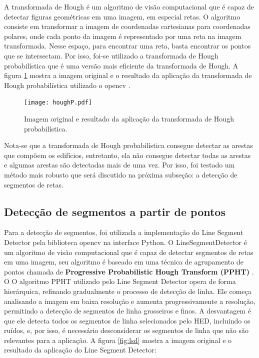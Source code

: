 \documentclass[12pt]{article}
\begin{document}
A transformada de Hough \cite{illingworth1988survey} é um algoritmo de visão computacional que é capaz de detectar figuras geométricas em uma imagem, em especial retas. O algoritmo consiste em transformar a imagem de coordenadas cartesianas para coordenadas polares, onde cada ponto da imagem é representado por uma reta na imagem transformada. Nesse espaço, para encontrar uma reta, basta encontrar os pontos que se intersectam. Por isso, foi-se utilizado a transformada de Hough probabilística \cite{matas2000robust} que é uma versão mais eficiente da transformada de Hough. A figura \ref{fig:hough} mostra a imagem original e o resultado da aplicação da transformada de Hough probabilística utilizado o opencv \cite{opencv_hough}.


\begin{figure}
\centering
\texttt{[image: houghP.pdf]}
\caption{Imagem original e resultado da aplicação da transformada de Hough probabilística.}
\label{fig:hough}
\end{figure}

Nota-se que a transformada de Hough probabilística consegue detectar as arestas que compõem os edifícios, entretanto, ela não consegue detectar todas as arestas e algumas arestas são detectadas mais de uma vez. Por isso, foi testado um método mais robusto que será discutido na próxima subseção: a detecção de segmentos de retas.

\subsection{Detecção de segmentos a partir de pontos}

Para a detecção de segmentos, foi utilizada a implementação do Line Segment Detector \cite{opencv_manual} pela biblioteca opencv \cite{opencv_library} na interface Python. O LineSegmentDetector é um algoritmo de visão computacional que é capaz de detectar segmentos de retas em uma imagem, seu algoritmo é baseado em uma técnica de agrupamento de pontos chamada de \textbf{Progressive Probabilistic Hough Transform (PPHT)} \cite{matas2000robust}. O O algoritmo PPHT utilizado pelo Line Segment Detector opera de forma hierárquica, refinando gradualmente o processo de detecção de linha. Ele começa analisando a imagem em baixa resolução e aumenta progressivamente a resolução, permitindo a detecção de segmentos de linha grosseiros e finos. A desvantagem é que ele detecta todos os segmentos de linha selecionados pelo HED, incluindo os ruídos, e, por isso, é necessário desconsiderar os segmentos de linha que não são relevantes para a aplicação. A figura \ref{fig:lsd} mostra a imagem original e o resultado da aplicação do Line Segment Detector:
\end{document}
